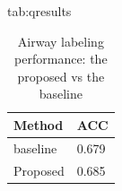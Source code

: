 \documentclass{midl} %
\begin{document}
\begin{table}[htbp]
\floatconts
{tab:qresults}
  {\caption{Airway labeling performance: the proposed vs the baseline}}%
  {\begin{tabular}{ll}
  \toprule
  \bfseries Method & \bfseries ACC\\
  \midrule
  baseline & 0.679\\
  \midrule
  Proposed & 0.685\\
  \bottomrule
  \end{tabular}
  }
\end{table}




\end{document}
